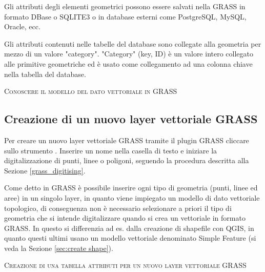 Gli attributi degli elementi geometrici possono essere salvati nella
 GRASS in formato DBase o SQLITE3 o in database esterni
come PostgreSQL, MySQL, Oracle, ecc.

Gli attributi contenuti nelle tabelle del database sono collegate  alla
geometria per mezzo di un valore "category".
"Category" (key, ID) è un valore intero collegato alle primitive geometriche
ed è usato come collegamento ad una colonna chiave nella tabella del database.

\begin{Tip}\caption{\textsc{Conoscere il modello del dato vettoriale in GRASS}}
\end{Tip} 

\subsection{Creazione di un nuovo layer vettoriale GRASS}\label{sec:creating_new_grass_vectors}

Per creare un nuovo layer vettoriale GRASS tramite il plugin GRASS cliccare
sullo strumento . 
Inserire un nome nella casella di testo e iniziare la digitalizzazione di
punti, linee o poligoni, seguendo la procedura descritta alla Sezione
\ref{grass_digitising}. 

Come detto in GRASS è possibile inserire ogni tipo di geometria (punti, linee
ed aree) in un singolo layer, in quanto viene impiegato un modello di dato
vettoriale topologico, di conseguenza non è necessario selezionare a priori il tipo di
geometria che si intende digitalizzare quando si crea un vettoriale in formato
GRASS. In questo si differenzia ad es. dalla creazione di shapefile con QGIS,
in quanto questi ultimi usano un modello vettoriale denominato Simple Feature
(si veda la Sezione \ref{sec:create shape}).

\begin{Tip}\caption{\textsc{Creazione di una tabella attributi per un nuovo
layer vettoriale GRASS}}
\end{Tip} 

